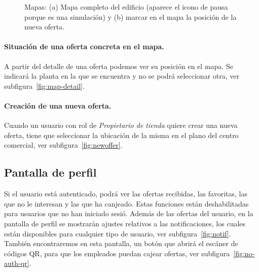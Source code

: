 \begin{figure}[tbp]
\caption{Mapas: (a) Mapa completo del edificio (aparece el icono de pausa porque es una simulación) y (b) marcar en el mapa la posición de la nueva oferta.}
\end{figure}

\paragraph{Situación de una oferta concreta en el mapa.} A partir del detalle de una oferta podemos ver su posición en el mapa. Se indicará la planta en la que se encuentra y no se podrá seleccionar otra, ver subfigura~\ref{fig:map-detail}.

\paragraph{Creación de una nueva oferta.} Cuando un usuario con rol de \textit{Propietario de tienda} quiere crear una nueva oferta, tiene que seleccionar la ubicación de la misma en el plano del centro comercial, ver subfigura~\ref{fig:newoffer}.

\subsection{Pantalla de perfil}
Si el usuario está autenticado, podrá ver las ofertas recibidas, las favoritas, las que no le interesan y las que ha canjeado. Estas funciones están deshabilitadas para usuarios que no han iniciado sesió. Además de las ofertas del usuario, en la pantalla de perfil se mostrarán ajustes relativos a las notificaciones, los cuales están disponibles para cualquier tipo de usuario, ver subfigura~\ref{fig:notif}. También encontraremos en esta pantalla, un botón que abrirá el escáner de códigos QR, para que los empleados puedan cajear ofertas, ver subfigura~\ref{fig:no-auth-qr}.


